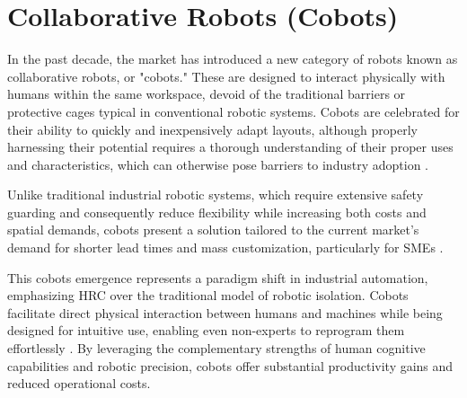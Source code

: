 
\section{Collaborative Robots (Cobots)} 


In the past decade, the market has introduced a new category of robots known as collaborative robots, or "cobots." These are designed to interact 
physically with humans within the same workspace, devoid of the traditional barriers or protective cages typical in conventional robotic systems. 
Cobots are celebrated for their ability to quickly and inexpensively adapt layouts, although properly harnessing their potential requires a thorough 
understanding of their proper uses and characteristics, which can otherwise pose barriers to industry adoption \cite{robotics8040100}.



Unlike traditional industrial robotic systems, which require extensive safety guarding and consequently reduce flexibility while increasing both costs and spatial demands, cobots present a solution tailored to the current market's demand for shorter lead times and mass customization, particularly for \ac{SMEs} \cite{barbazza2017agility}.

This cobots emergence represents a paradigm shift in industrial automation, emphasizing \ac{HRC} over the traditional model of robotic isolation. Cobots facilitate direct physical interaction between humans and machines while being designed for intuitive use, enabling even non-experts to reprogram them effortlessly \cite{7140065}. By leveraging the complementary strengths of human cognitive capabilities and robotic precision, cobots offer substantial productivity gains and reduced operational costs.


